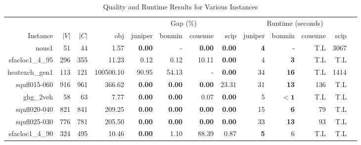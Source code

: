 \begin{landscape} 
\begin{table*}[t] 
\footnotesize 
\caption{Quality and Runtime Results for Various Instances} 
\begin{tabular}{|r|r|r||r||r|r|r|r||r|r|r|r|r|} 
\hline 
                        &     &       &             & \multicolumn{4}{c||}{Gap (\%)} &  \multicolumn{4}{c|}{Runtime (seconds)} \\ 
    Instance              & $|V|$& $|C|$& obj         & juniper    & bonmin & couenne        & scip            & juniper          & bonmin            & couenne         & scip \\ 
    \hline 
    \hline 
                            nous1 &           51 &           44 &                1.57 &  \textbf{0.00} &              - &  \textbf{0.00} &  \textbf{0.00} &         \textbf{4} &                  - &          T.L &         3067 \\ 
                  sfacloc1\_4\_95 &          296 &          355 &               11.23 &           0.12 &           0.12 &          10.11 &  \textbf{0.00} &                  4 &         \textbf{3} &          T.L &          T.L \\ 
                   heatexch\_gen1 &          113 &          121 &           100500.10 &          90.95 &          54.13 &              - &  \textbf{0.00} &                 34 &        \textbf{16} &          T.L &         1414 \\ 
                     squfl015-060 &          916 &          961 &              366.62 &  \textbf{0.00} &  \textbf{0.00} &  \textbf{0.00} &          23.31 &                 31 &        \textbf{13} &          136 &          T.L \\ 
                        ghg\_2veh &           58 &           63 &                7.77 &  \textbf{0.00} &  \textbf{0.00} &           0.07 &  \textbf{0.00} &                  5 &         $\bm{< 1}$ &          T.L &          T.L \\ 
                     squfl020-040 &          821 &          841 &              209.25 &  \textbf{0.00} &  \textbf{0.00} &  \textbf{0.00} &  \textbf{0.00} &                 15 &         \textbf{6} &           79 &          T.L \\ 
                     squfl025-030 &          776 &          781 &              205.50 &  \textbf{0.00} &  \textbf{0.00} &  \textbf{0.00} &  \textbf{0.00} &                 33 &        \textbf{13} &           93 &          T.L \\ 
                  sfacloc1\_4\_90 &          324 &          495 &               10.46 &  \textbf{0.00} &           1.10 &          88.39 &           0.87 &         \textbf{5} &                  6 &          T.L &          T.L \\ 

\end{tabular}
\end{table*}
\end{landscape}
